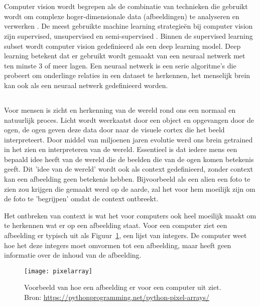 \section{}
\label{sec:computer-vision}
Computer vision wordt begrepen als de combinatie van technieken die gebruikt wordt om complexe hoger-dimensionale data (afbeeldingen) te analyseren en verwerken \autocite{Jaehne2000}. De meest gebruikte machine learning strategieën bij computer vision zijn supervised, unsupervised en semi-supervised \autocite{Khan2020}. Binnen de supervised learning subset wordt computer vision gedefinieerd als een deep learning model. Deep learning betekent dat er gebruikt wordt gemaakt van een neuraal netwerk met ten minste 3 of meer lagen. Een neuraal netwerk is een serie algoritme's die probeert om onderlinge relaties in een dataset te herkennen, het menselijk brein kan ook als een neuraal netwerk gedefinieerd worden.

\subsection{}
\label{sec:how-do-computer-see}

Voor mensen is zicht en herkenning van de wereld rond ons een normaal en natuurlijk proces. Licht wordt weerkaatst door een object en opgevangen door de ogen, de ogen geven deze data door naar de visuele cortex die het beeld interpreteert. Door middel van miljoenen jaren evolutie werd ons brein getrained in het zien en interpreteren van de wereld. Essentieel is dat iedere mens een bepaald idee heeft van de wereld die de beelden die van de ogen komen betekenis geeft. Dit 'idee van de wereld' wordt ook als context gedefinieerd, zonder context kan een afbeelding geen betekenis hebben.
Bijvoorbeeld als een alien een foto te zien zou krijgen die gemaakt werd op de aarde, zal het voor hem moeilijk zijn om de foto te 'begrijpen' omdat de context ontbreekt.

Het ontbreken van context is wat het voor computers ook heel moeilijk maakt om te herkennen wat er op een afbeelding staat. Voor een computer ziet een afbeelding er typisch uit als Figuur~\ref{fig:pixelarray}, een lijst van integers. De computer weet hoe het deze integers moet omvormen tot een afbeelding, maar heeft geen informatie over de inhoud van de afbeelding.

\begin{figure}
    \centering
    \texttt{[image: pixelarray]}
    \caption{Voorbeeld van hoe een afbeelding er voor een computer uit ziet. Bron: \url{https://pythonprogramming.net/python-pixel-arrays/}}
    \label{fig:pixelarray}
\end{figure}

